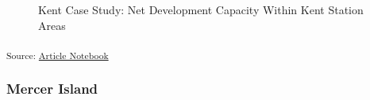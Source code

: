 \documentclass[
]{agujournal2019}
\begin{document}
\label{cell-fig-results-case-studies-kent-maps}
\begin{figure}[H]


\caption{\label{fig-results-case-studies-kent-maps}Kent Case Study: Net
Development Capacity Within Kent Station Areas}

\end{figure}%

\textsubscript{Source:
\href{https://tiernanmartin.github.io/2024-transit-oriented-development-bill/index.qmd.html}{Article
Notebook}}

\subsubsection{Mercer Island}\label{mercer-island}
\end{document}
